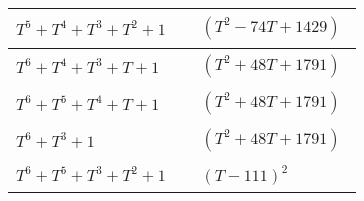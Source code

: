 \begin{tabular}{| l | l |}
\hline
$T^5 + T^4 + T^3 + T^2 + 1$ &
$\!\begin{aligned}
	&(T^{2} - 74T + 1429)\end{aligned}$ \\
\hline
$T^6 + T^4 + T^3 + T + 1$ &
$\!\begin{aligned}
	&(T^{2} + 48T + 1791)\end{aligned}$ \\
\hline
$T^6 + T^5 + T^4 + T + 1$ &
$\!\begin{aligned}
	&(T^{2} + 48T + 1791)\end{aligned}$ \\
\hline
$T^6 + T^3 + 1$ &
$\!\begin{aligned}
	&(T^{2} + 48T + 1791)\end{aligned}$ \\
\hline
$T^6 + T^5 + T^3 + T^2 + 1$ &
$\!\begin{aligned}
	&(T - 111)^{2}\end{aligned}$ \\
\hline
\end{tabular}


